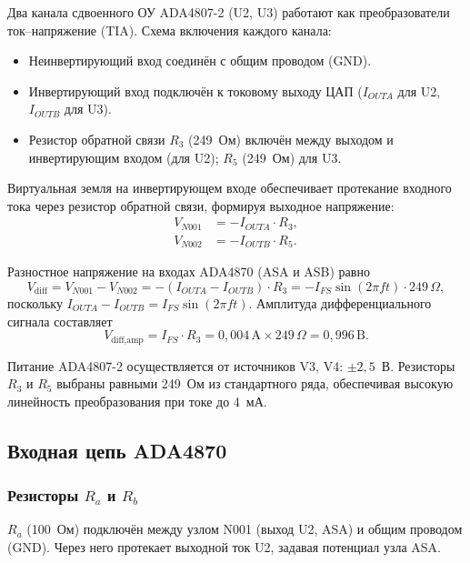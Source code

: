 \documentclass[a4paper, 12pt]{article}
\begin{document}
Два канала сдвоенного ОУ ADA4807-2 (U2, U3) работают как
преобразователи ток--напряжение (TIA).
Схема включения каждого канала:
\begin{itemize}
    \item Неинвертирующий вход соединён с общим проводом (GND).
    \item Инвертирующий вход подключён к токовому выходу ЦАП
          (\(I_{OUTA}\) для U2, \(I_{OUTB}\) для U3).
    \item Резистор обратной связи \(R_3\) (249~Ом) включён между выходом
          и инвертирующим входом (для U2); \(R_5\) (249~Ом) для U3.
\end{itemize}
Виртуальная земля на инвертирующем входе обеспечивает
протекание входного тока через резистор обратной связи,
формируя выходное напряжение:
\begin{align}
    V_{N001} &= -I_{OUTA} \cdot R_3, \label{eq:v_n001}\\
    V_{N002} &= -I_{OUTB} \cdot R_5. \label{eq:v_n002}
\end{align}

Разностное напряжение на входах ADA4870 (ASA и ASB) равно
\begin{equation}
    V_{\text{diff}} = V_{N001} - V_{N002}
    = -(I_{OUTA} - I_{OUTB}) \cdot R_3
    = -I_{FS}\sin(2\pi f t) \cdot 249\,\Omega,
\end{equation}
поскольку \(I_{OUTA} - I_{OUTB} = I_{FS}\sin(2\pi f t)\).
Амплитуда дифференциального сигнала составляет
\[
    V_{\text{diff,amp}} = I_{FS} \cdot R_3 = 0{,}004\,\text{A} \times 249\,\Omega
    = 0{,}996\,\text{B}.
\]

Питание ADA4807-2 осуществляется от источников V3, V4: $\pm 2{,}5$~В.
Резисторы \(R_3\) и \(R_5\) выбраны равными 249~Ом из стандартного
ряда, обеспечивая высокую линейность преобразования при токе до 4~мА.

\subsection{Входная цепь ADA4870}

\subsubsection{Резисторы \texorpdfstring{\(R_{a}\) и \(R_{b}\)}{Ra и Rb}}

\textbf{\(R_{a}\)} (100~Ом) подключён между узлом N001 (выход U2, ASA)
и общим проводом (GND). Через него протекает выходной ток U2,
задавая потенциал узла ASA.
\end{document}

